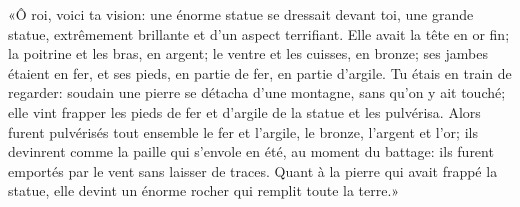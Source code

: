 «Ô roi, voici ta vision: une énorme statue se dressait devant toi,
	une grande statue, extrêmement brillante et d’un aspect terrifiant.
Elle avait la tête en or fin; la poitrine et les bras, en argent;
	le ventre et les cuisses, en bronze; ses jambes étaient en fer,
	et ses pieds, en partie de fer, en partie d’argile.
Tu étais en train de regarder:
	soudain une pierre se détacha d’une montagne, sans qu’on y ait touché;
	elle vint frapper les pieds de fer et d’argile de la statue et les pulvérisa.
Alors furent pulvérisés tout ensemble le fer et l’argile, le bronze, l’argent et l’or;
	ils devinrent comme la paille qui s’envole en été, au moment du battage:
	ils furent emportés par le vent sans laisser de traces.
Quant à la pierre qui avait frappé la statue,
	elle devint un énorme rocher qui remplit toute la terre.»
